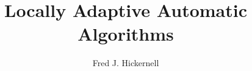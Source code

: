 \documentclass[final]{elsarticle}
\theoremstyle{definition}
\theoremstyle{remark}
\begin{document}
\begin{frontmatter}

\title{Locally Adaptive Automatic Algorithms}
\author{Fred J. Hickernell}
\address{Room E1-208, Department of Applied Mathematics, Illinois Institute of Technology,\\ 10 W.\ 32$^{\text{nd}}$ St., Chicago, IL 60616}
\begin{abstract}
\end{abstract}

\begin{keyword}


\end{keyword}
\end{frontmatter}

\end{document}
